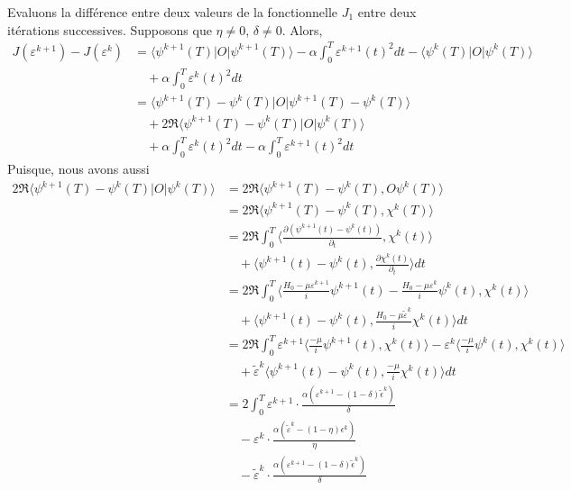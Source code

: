 \begin{ proof }
Evaluons la différence entre deux valeurs de la fonctionnelle $J_1$ entre deux itérations successives. Supposons que $\eta \neq 0$, $\delta \neq 0$. Alors,
\begin{align*}
J(\varepsilon^{k+1})-J(\varepsilon^{k}) &= \langle \psi^{k+1}(T)|O| \psi^{k+1}(T) \rangle-\alpha \int_{0}^{T} \varepsilon^{k+1}(t)^2 dt - \langle \psi^{k}(T)|O| \psi^{k}(T) \rangle\\
&\quad + \alpha \int_{0}^{T} \varepsilon^{k}(t)^2 dt \\
&=\langle \psi^{k+1}(T)-\psi^{k}(T)|O| \psi^{k+1}(T)-\psi^{k}(T)\rangle \\
&\quad +2\Re \langle \psi^{k+1}(T)-\psi^{k}(T)|O|\psi^{k}(T)\rangle\\ 
&\quad +\alpha \int_{0}^{T} \varepsilon^{k}(t)^2 dt-\alpha\int_{0}^{T} \varepsilon^{k+1}(t)^2 dt
\end{align*}
Puisque, nous avons aussi
\begin{align*}
2\Re \langle \psi^{k+1}(T)-\psi^{k}(T)|O|\psi^{k}(T)\rangle &= 2\Re \langle \psi^{k+1}(T)-\psi^{k}(T), O\psi^{k}(T)\rangle\\
&= 2\Re \langle \psi^{k+1}(T)-\psi^{k}(T), \chi^{k}(T)\rangle\\
&= 2\Re \int_{0}^{T} \langle \frac{\partial (\psi^{k+1}(t)-\psi^{k}(t))}{\partial_{t}}, \chi^{k}(t) \rangle\\
&\quad + \langle \psi^{k+1}(t)-\psi^{k}(t), \frac{\partial \chi^{k}(t)}{\partial_{t}} \rangle dt\\
&= 2\Re \int_{0}^{T} \langle \frac{H_0-\mu \varepsilon^{k+1}}{i}\psi^{k+1}(t) - \frac{H_0-\mu \varepsilon^{k}}{i}\psi^{k}(t), \chi^{k}(t) \rangle\\
&\quad + \langle \psi^{k+1}(t)-\psi^{k}(t), \frac{H_0-\mu \tilde{\varepsilon}^k}{i}\chi^{k}(t) \rangle dt\\
&= 2\Re \int_{0}^{T} \varepsilon^{k+1} \langle \frac{-\mu}{i}\psi^{k+1}(t), \chi^{k}(t)\rangle- \varepsilon^{k} \langle \frac{-\mu}{i}\psi^{k}(t), \chi^{k}(t)\rangle\\
&\quad + \tilde{\varepsilon}^{k} \langle \psi^{k+1}(t)-\psi^{k}(t), \frac{-\mu}{i} \chi^{k}(t)\rangle dt\\
&= 2 \int_{0}^{T} \varepsilon^{k+1} \cdot \frac{\alpha (\varepsilon^{k+1}-(1-\delta)\tilde{\epsilon}^k)}{\delta}\\
&\quad - \varepsilon^{k} \cdot \frac{\alpha (\tilde{\varepsilon}^{k}-(1-\eta)\epsilon^k)}{\eta}\\
&\quad - \tilde{\varepsilon}^{k} \cdot \frac{\alpha (\varepsilon^{k+1}-(1-\delta)\tilde{\epsilon}^k)}{\delta}\\

\end{align*}
\end{ proof }
